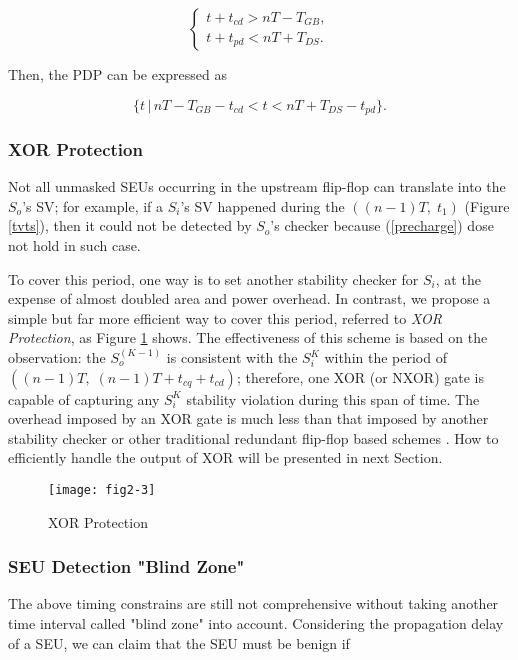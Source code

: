 \[
\left\{
\begin{array}{ll}
 t+t_{cd} > nT-T_{GB}, \\
 t+t_{pd} < nT+T_{DS}.
 \end{array} \right.
\]

Then, the PDP can be expressed as

\begin{equation} \label{eq2}
\{t\,|\, nT-T_{GB}-t_{cd} < t <nT+T_{DS}-t_{pd}\}.
\end{equation}

\subsubsection{XOR Protection}

Not all unmasked SEUs occurring in the upstream flip-flop can translate into the $S_o$'s SV; for example, if a  $S_i$'s SV happened during the $((n-1)T,\; t_1)$ (Figure \ref{tvts}), then it could not be detected by $S_o$'s checker  because (\ref{precharge}) dose not hold in such case.

To cover this period, one way is to set another stability checker for $S_i$, at the expense of almost doubled area and power overhead. In contrast, we propose a simple but far more efficient way to cover this period, referred to \emph{XOR Protection}, as Figure \ref{xor} shows. The effectiveness of this scheme is based on the observation: the $S_o^{(K-1)}$ is consistent with the $S_i^K$ within the period of $((n-1)T,\; (n-1)T+t_{cq}+t_{cd})$; therefore, one XOR (or NXOR) gate is capable of capturing any $S_i^K$ stability violation during this span of time. The overhead imposed by an XOR gate is much less than that imposed by another stability checker or other traditional redundant flip-flop based schemes \cite{Mitra_C05}. How to efficiently handle the output of XOR will be presented in next Section.

\begin{figure}[t]
\centering
\texttt{[image: fig2-3]}
\vspace{-0.5em}  
\caption{XOR Protection}\label{xor}
\end{figure}

\subsubsection{SEU Detection "Blind Zone"}

The above timing constrains are still not comprehensive without taking another time interval called "blind zone" into account.  Considering the propagation delay of a SEU, we can claim that the SEU must be benign if

